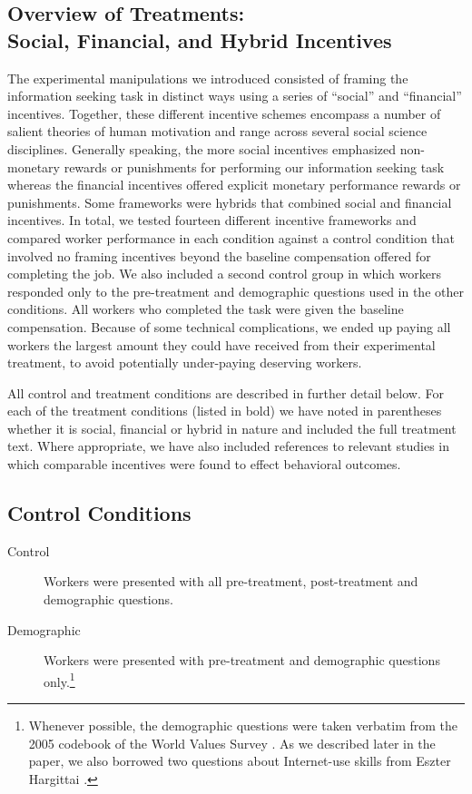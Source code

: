 \documentclass{chi2009}
\begin{document}
\subsection{Overview of Treatments:\\Social, Financial, and Hybrid Incentives}

The experimental manipulations we introduced consisted of framing the
information seeking task in distinct ways using a series of ``social''
and ``financial'' incentives. Together, these different incentive
schemes encompass a number of salient theories of human motivation and
range across several social science disciplines. Generally speaking,
the more social incentives emphasized non-monetary rewards or
punishments for performing our information seeking task whereas the
financial incentives offered explicit monetary performance rewards or
punishments. Some frameworks were hybrids that combined social and
financial incentives. In total, we tested fourteen different incentive
frameworks and compared worker performance in each condition against a
control condition that involved no framing incentives beyond the
baseline compensation offered for completing the job. We also included
a second control group in which workers responded only to the
pre-treatment and demographic questions used in the other
conditions. All workers who completed the task were given the baseline
compensation. Because of some technical complications, we ended up
paying all workers the largest amount they could have received from
their experimental treatment, to avoid potentially under-paying
deserving workers.

All control and treatment conditions are described in further detail
below. For each of the treatment conditions (listed in bold) we have
noted in parentheses whether it is social, financial or hybrid in
nature and included the full treatment text. Where appropriate, we
have also included references to relevant studies in which comparable
incentives were found to effect behavioral outcomes.

\subsection{Control Conditions} 

\begin{description}
\item[Control] Workers were presented with all pre-treatment, post-treatment and demographic questions.
\item[Demographic] Workers were presented with pre-treatment and demographic questions only.\footnote{Whenever possible, the demographic questions were taken verbatim from the 2005 codebook of the World Values Survey \cite{world_vals_survey2009}. As we described later in the paper, we also borrowed two questions about Internet-use skills from Eszter Hargittai \cite{hargittai2009update}.}
\end{description}
\end{document}
